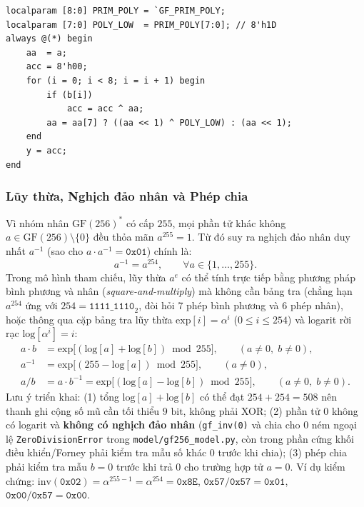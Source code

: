 \documentclass[12pt,a4paper]{report}
\begin{document}
\begin{lstlisting}[style=verilogstyle, caption={Triển khai mạch nhân tổ hợp 8 bước trong \texttt{rtl/gf\_arithmetic/gf256\_mul.v}}, label={lst:gf256-mul}]
localparam [8:0] PRIM_POLY = `GF_PRIM_POLY;
localparam [7:0] POLY_LOW  = PRIM_POLY[7:0]; // 8'h1D
always @(*) begin
    aa  = a;
    acc = 8'h00;
    for (i = 0; i < 8; i = i + 1) begin
        if (b[i])
            acc = acc ^ aa;
        aa = aa[7] ? ((aa << 1) ^ POLY_LOW) : (aa << 1);
    end
    y = acc;
end
\end{lstlisting}

\subsubsection{Lũy thừa, Nghịch đảo nhân và Phép chia}
Vì nhóm nhân $\text{GF}(256)^*$ có cấp $255$, mọi phần tử khác không $a \in \text{GF}(256) \setminus \{0\}$ đều thỏa mãn $a^{255} = 1$. Từ đó suy ra nghịch đảo nhân duy nhất $a^{-1}$ (sao cho $a \cdot a^{-1} = \texttt{0x01}$) chính là:
\begin{equation}
    a^{-1} = a^{254}, \qquad \forall a \in \{1, \dots, 255\}.
    \label{eq:gf-inv}
\end{equation}
Trong mô hình tham chiếu, lũy thừa $a^e$ có thể tính trực tiếp bằng phương pháp bình phương và nhân (\textit{square-and-multiply}) mà không cần bảng tra (chẳng hạn $a^{254}$ ứng với $254 = \texttt{1111\_1110}_2$, đòi hỏi 7 phép bình phương và 6 phép nhân), hoặc thông qua cặp bảng tra lũy thừa $\text{exp}[i] = \alpha^i$ ($0 \le i \le 254$) và logarit rời rạc $\text{log}[\alpha^i] = i$:
\begin{align}
    a \cdot b &= \text{exp}\bigl[(\text{log}[a] + \text{log}[b]) \bmod 255\bigr], \qquad (a \ne 0,\; b \ne 0), \\
    a^{-1}    &= \text{exp}\bigl[(255 - \text{log}[a]) \bmod 255\bigr], \qquad (a \ne 0), \\
    a / b     &= a \cdot b^{-1} = \text{exp}\bigl[(\text{log}[a] - \text{log}[b]) \bmod 255\bigr], \qquad (a \ne 0,\; b \ne 0).
\end{align}
Lưu ý triển khai: (1) tổng $\text{log}[a] + \text{log}[b]$ có thể đạt $254 + 254 = 508$ nên thanh ghi cộng số mũ cần tối thiểu $9\text{ bit}$, không phải XOR; (2) phần tử $0$ không có logarit và \textbf{không có nghịch đảo nhân} (\texttt{gf\_inv(0)} và chia cho $0$ ném ngoại lệ \texttt{ZeroDivisionError} trong \texttt{model/gf256\_model.py}, còn trong phần cứng khối điều khiển/Forney phải kiểm tra mẫu số khác $0$ trước khi chia); (3) phép chia phải kiểm tra mẫu $b = 0$ trước khi trả $0$ cho trường hợp tử $a = 0$. Ví dụ kiểm chứng: $\text{inv}(\texttt{0x02}) = \alpha^{255-1} = \alpha^{254} = \texttt{0x8E}$, $\texttt{0x57}/\texttt{0x57} = \texttt{0x01}$, $\texttt{0x00}/\texttt{0x57} = \texttt{0x00}$.
\end{document}
